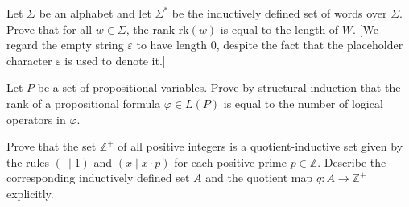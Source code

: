 \begin{exercise}
Let $\Sigma$ be an alphabet and let $\Sigma^*$ be the inductively defined set of words over $\Sigma$. Prove that for all $w \in \Sigma$, the rank $\mathrm{rk}(w)$ is equal to the length of $W$. [We regard the empty string $\varepsilon$ to have length $0$, despite the fact that the placeholder character $\varepsilon$ is used to denote it.]
\end{exercise}



\begin{exercise}
Let $P$ be a set of propositional variables. Prove by structural induction that the rank of a propositional formula $\varphi \in L(P)$ is equal to the number of logical operators in $\varphi$.
\end{exercise}



\begin{exercise}
Prove that the set $\mathbb{Z}^+$ of all positive integers is a quotient-inductive set given by the rules $(~ \mid 1)$ and $(x \mid x \cdot p)$ for each positive prime $p \in \mathbb{Z}$. Describe the corresponding inductively defined set $A$ and the quotient map $q : A \to \mathbb{Z}^+$ explicitly.
\end{exercise}

